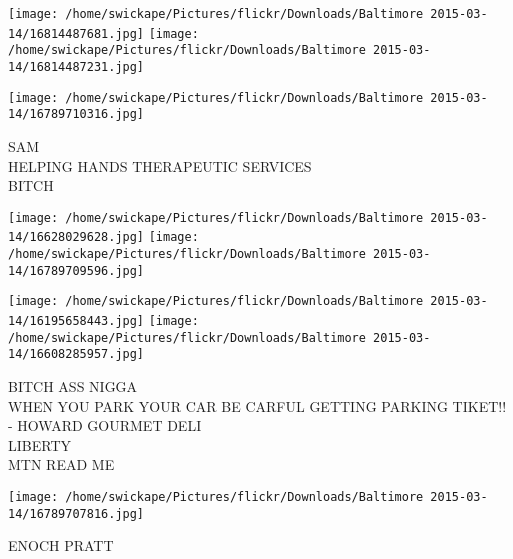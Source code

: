 \documentclass[10pt,letterpaper]{article}
\begin{document}
\texttt{[image: /home/swickape/Pictures/flickr/Downloads/Baltimore 2015-03-14/16814487681.jpg]}
\texttt{[image: /home/swickape/Pictures/flickr/Downloads/Baltimore 2015-03-14/16814487231.jpg]}

\vspace{0.25in}
\texttt{[image: /home/swickape/Pictures/flickr/Downloads/Baltimore 2015-03-14/16789710316.jpg]}

SAM\\
HELPING HANDS THERAPEUTIC SERVICES\\
BITCH\\
\pagebreak

\texttt{[image: /home/swickape/Pictures/flickr/Downloads/Baltimore 2015-03-14/16628029628.jpg]}
\texttt{[image: /home/swickape/Pictures/flickr/Downloads/Baltimore 2015-03-14/16789709596.jpg]}

\texttt{[image: /home/swickape/Pictures/flickr/Downloads/Baltimore 2015-03-14/16195658443.jpg]}
\texttt{[image: /home/swickape/Pictures/flickr/Downloads/Baltimore 2015-03-14/16608285957.jpg]}

BITCH ASS NIGGA\\
WHEN YOU PARK YOUR CAR BE CARFUL GETTING PARKING TIKET!! {-} HOWARD GOURMET DELI\\
LIBERTY\\
MTN READ ME\\
\pagebreak

\texttt{[image: /home/swickape/Pictures/flickr/Downloads/Baltimore 2015-03-14/16789707816.jpg]}

ENOCH PRATT\\
\pagebreak
\end{document}
